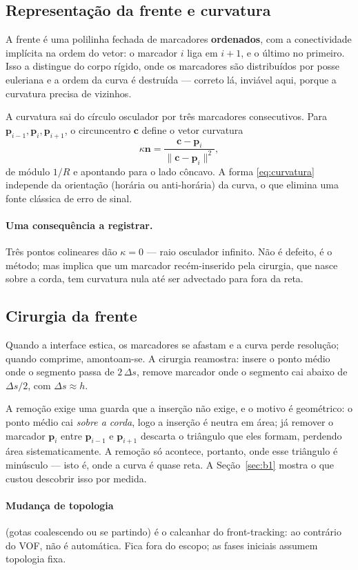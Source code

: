 \subsection{Representa\c{c}\~ao da frente e curvatura}

A frente \'e uma polilinha fechada de marcadores \textbf{ordenados}, com a
conectividade impl\'icita na ordem do vetor: o marcador $i$ liga em $i+1$, e o
\'ultimo no primeiro. Isso a distingue do corpo r\'igido, onde os marcadores s\~ao
distribu\'idos por posse euleriana e a ordem da curva \'e destru\'ida --- correto
l\'a, invi\'avel aqui, porque a curvatura precisa de vizinhos.

A curvatura sai do c\'irculo osculador por tr\^es marcadores consecutivos. Para
$\mathbf{p}_{i-1},\mathbf{p}_i,\mathbf{p}_{i+1}$, o circuncentro $\mathbf{c}$
define o vetor curvatura
\begin{equation}
  \kappa\mathbf{n} = \frac{\mathbf{c}-\mathbf{p}_i}{\lVert\mathbf{c}-\mathbf{p}_i\rVert^{2}},
  \label{eq:curvatura}
\end{equation}
de m\'odulo $1/R$ e apontando para o lado c\^oncavo. A forma
\eqref{eq:curvatura} independe da orienta\c{c}\~ao (hor\'aria ou anti-hor\'aria)
da curva, o que elimina uma fonte cl\'assica de erro de sinal.

\paragraph{Uma consequ\^encia a registrar.} Tr\^es pontos colineares d\~ao
$\kappa=0$ --- raio osculador infinito. N\~ao \'e defeito, \'e o m\'etodo; mas
implica que um marcador rec\'em-inserido pela cirurgia, que nasce sobre a corda,
tem curvatura nula at\'e ser advectado para fora da reta.

\subsection{Cirurgia da frente}

Quando a interface estica, os marcadores se afastam e a curva perde
resolu\c{c}\~ao; quando comprime, amontoam-se. A cirurgia reamostra: insere o
ponto m\'edio onde o segmento passa de $2\,\Delta s$, remove marcador onde o
segmento cai abaixo de $\Delta s/2$, com $\Delta s \approx h$.

A remo\c{c}\~ao exige uma guarda que a inser\c{c}\~ao n\~ao exige, e o motivo \'e
geom\'etrico: o ponto m\'edio cai \emph{sobre a corda}, logo a inser\c{c}\~ao \'e
neutra em \'area; j\'a remover o marcador $\mathbf{p}_i$ entre $\mathbf{p}_{i-1}$
e $\mathbf{p}_{i+1}$ descarta o tri\^angulo que eles formam, perdendo \'area
sistematicamente. A remo\c{c}\~ao s\'o acontece, portanto, onde esse tri\^angulo
\'e min\'usculo --- isto \'e, onde a curva \'e quase reta. A
Se\c{c}\~ao~\ref{sec:b1} mostra o que custou descobrir isso por medida.

\paragraph{Mudan\c{c}a de topologia} (gotas coalescendo ou se partindo) \'e o
calcanhar do front-tracking: ao contr\'ario do VOF, n\~ao \'e autom\'atica. Fica
fora do escopo; as fases iniciais assumem topologia fixa.
